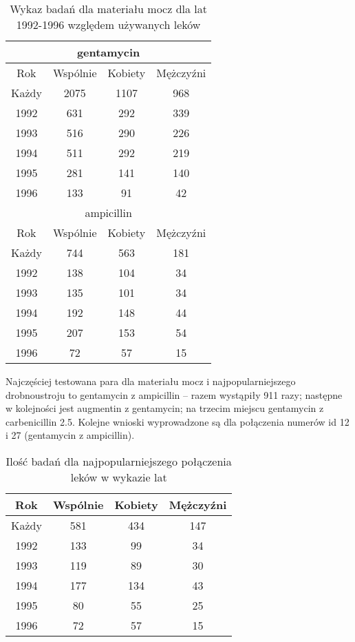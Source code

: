 \documentclass[a4paper,11pt]{article}
\begin{document}
\begin{table}[h]
  \begin{center}
  \caption{Wykaz badań dla materiału mocz dla lat 1992-1996 względem używanych leków}
  \begin{tabular}{|c|c|c|c|}
    \hline
    \multicolumn{4}{|c|}{gentamycin} \\ 
    \hline Rok &Wspólnie & Kobiety & Mężczyźni \\ \hline
Każdy& 2075& 1107& 968 \\ \hline 
1992& 631& 292& 339 \\ \hline
1993& 516& 290& 226 \\ \hline
1994& 511& 292& 219 \\ \hline
1995& 281& 141& 140 \\ \hline
1996& 133& 91& 42 \\ \hline
\multicolumn{4}{|c|}{ampicillin} \\ 
\hline Rok &Wspólnie & Kobiety & Mężczyźni \\ \hline
Każdy& 744& 563& 181 \\ \hline 
1992& 138& 104& 34 \\ \hline
1993& 135& 101& 34 \\ \hline
1994& 192& 148& 44 \\ \hline
1995& 207& 153& 54 \\ \hline
1996& 72& 57& 15 \\ \hline
  \end{tabular}
\end{center}
\end{table}

Najczęściej testowana para dla materiału mocz i najpopularniejszego drobnoustroju to gentamycin z ampicillin – razem wystąpiły 911 razy;
 następne w kolejności jest augmentin z gentamycin; na trzecim miejscu gentamycin z carbenicillin 2.5.
Kolejne wnioski wyprowadzone są dla połączenia numerów id 12 i 27 (gentamycin z ampicillin).


\begin{table}[h]
  \begin{center}
  \caption{Ilość badań dla najpopularniejszego połączenia leków w wykazie lat}
  \begin{tabular}{|c|c|c|c|}
\hline Rok &Wspólnie & Kobiety & Mężczyźni \\ \hline
Każdy& 581& 434& 147 \\ \hline 
1992& 133& 99& 34 \\ \hline
1993& 119& 89& 30 \\ \hline
1994& 177& 134& 43 \\ \hline
1995& 80& 55& 25 \\ \hline
1996& 72& 57& 15 \\ \hline

  \end{tabular}
\end{center}
\end{table}
\end{document}
